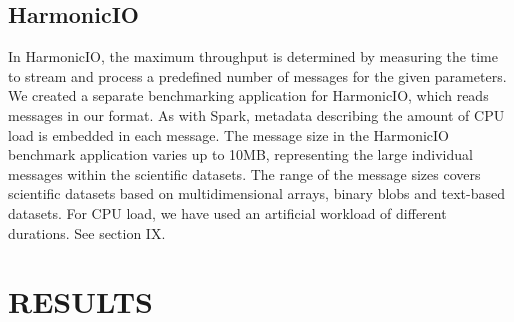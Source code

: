 \documentclass[letterpaper,conference]{IEEEtran}
\begin{document}


\subsection{HarmonicIO}

In HarmonicIO, the maximum throughput is determined by measuring the time to stream and process a predefined number of messages for the given parameters. 
We created a separate benchmarking application for HarmonicIO, which reads messages in our format. As with Spark, metadata describing the amount of CPU load is embedded in each message. 
The message size in the HarmonicIO benchmark application varies up to 10MB, representing the large individual messages within the scientific datasets. The range of the message sizes covers scientific datasets based on multidimensional arrays, binary blobs and text-based datasets. For CPU load, we have used an artificial workload of different durations. See section IX.




\section{RESULTS}\label{results}

\end{document}
